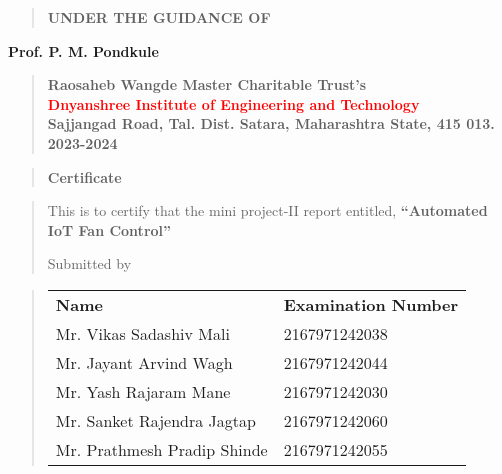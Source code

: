 \documentclass[12pt]{report}
\begin{document}
	\vspace{0.5cm}
	\begin{quote}
		\centering
		\large
		\textbf{UNDER THE GUIDANCE OF}
	\end{quote}
	\textbf{Prof. P. M. Pondkule}
	\vspace{0.5cm}
	\begin{quote}
		\centering
		\vspace{0.5cm}
		\bfseries
		\textbf{Raosaheb Wangde Master Charitable Trust's}\\
		\textcolor{red}{Dnyanshree Institute of Engineering and Technology}\\
		Sajjangad Road, Tal. Dist. Satara, Maharashtra State, 415 013.\\ 2023-2024
	\end{quote}
	\vspace{0.5cm}
	
	\newpage
	
	
	
	
	\begin{quote}
		\centering
		\LARGE
		\textbf{Certificate}
	\end{quote}
	
	\begin{quote}
		\normalsize
		\centering
		This is to certify that the mini project-II report entitled, \textbf{``Automated IoT Fan Control''}
		
		Submitted by\\[1ex]
	\end{quote}
	\vspace{0.5cm}
	\begin{quote}
		\centering
		\begin{table}[ht]
			\centering
			\begin{center}
				\begin{tabular}{l l}
					
					\!
					\bfseries \hspace{1.5mm} Name & \bfseries Examination Number \\
					
					Mr. Vikas Sadashiv Mali  & 2167971242038 \\
					Mr. Jayant Arvind Wagh & 2167971242044 \\
					Mr. Yash Rajaram Mane & 2167971242030 \\
					Mr. Sanket Rajendra Jagtap & 2167971242060\\
					Mr. Prathmesh Pradip Shinde & 2167971242055 \\
					
				\end{tabular}
			\end{center}
		\end{table}
	\end{quote}
	
\end{document}
